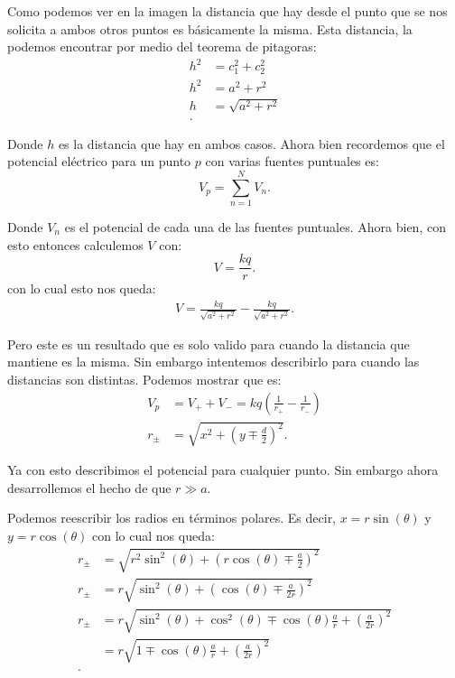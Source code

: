 \begin{enumerate}
      Como podemos ver en la imagen \label{fig:punto_2} la distancia que hay desde el punto que se nos solicita a ambos otros puntos es básicamente la misma. Esta distancia, la podemos encontrar por medio del teorema de pitagoras:
      \begin{align*}
        h^2 &= c_1^2 + c_2^2 \\
	h^2 &= a^2 + r^2 \\
	h &= \sqrt{a^2 + r^2}  \\
      .\end{align*}

      Donde $h$ es la distancia que hay en ambos casos. Ahora bien recordemos que el potencial eléctrico para un punto $p$ con varias fuentes puntuales es: \[
	V_p = \displaystyle\sum_{n = 1}^{N} V_n
      .\] 

      Donde $V_n$ es el potencial de cada una de las fuentes puntuales. Ahora bien, con esto entonces calculemos $V$ con:  \[
      V = \frac{kq}{r}
      .\] con lo cual esto nos queda:
      \begin{align*}
        V = \frac{k q}{\sqrt{a^2 + r^2} } - \frac{k q}{\sqrt{a^2 + r^2} }
      .\end{align*}

      Pero este es un resultado que es solo valido para cuando la distancia que mantiene es la misma. Sin embargo intentemos describirlo para cuando las distancias son distintas. Podemos mostrar que es:
      \begin{align*}
        V_p &= V_{+} + V_{-} = kq\left( \frac{1}{r_+} - \frac{1}{r_-} \right)  \\
	r_{\pm} &= \sqrt{x^2 + \left( y \mp \frac{d}{2} \right)^2 } 
      .\end{align*}

      Ya con esto describimos el potencial para cualquier punto. Sin embargo ahora desarrollemos el hecho de que $r \gg a$.

      Podemos reescribir los radios en términos polares. Es decir, $x = r \sin\left( \theta \right) $ y $y = r \cos\left( \theta \right) $ con lo cual nos queda:
      \begin{align*}
        r_{\pm} &= \sqrt{r^2\sin^2\left( \theta \right) + \left( r \cos\left( \theta \right) \mp \frac{a}{2} \right)^2}  \\
	r_{\pm} &= r \sqrt{\sin^2\left( \theta \right)  + \left( \cos\left( \theta \right) \mp \frac{a}{2r} \right)^2 }  \\
	r_{\pm} &= r \sqrt{\sin^2\left( \theta \right) + \cos^2\left( \theta \right) \mp \cos\left( \theta \right) \frac{a}{r} + \left( \frac{a}{2r} \right)^2 }  \\
	&= r \sqrt{1 \mp \cos\left( \theta \right) \frac{a}{r} + \left( \frac{a}{2r} \right)^2}  \\
      .\end{align*}


\end{enumerate}
